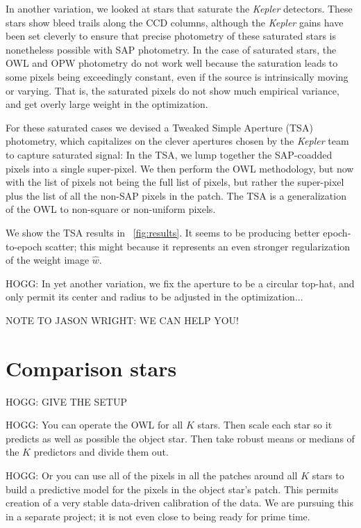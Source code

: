 \documentclass[12pt, letterpaper, preprint]{aastex}
\newcommand{\project}[1]{\textsl{#1}}
\begin{document}
In another variation, we looked at stars that saturate the \project{Kepler} detectors.
These stars show bleed trails along the CCD columns,
  although the \project{Kepler} gains have been set cleverly
  to ensure that precise photometry of these saturated stars is nonetheless possible with SAP photometry.
In the case of saturated stars, the OWL and OPW photometry do not work well
  because the saturation leads to some pixels being exceedingly constant,
  even if the source is intrinsically moving or varying.
That is, the saturated pixels do not show much empirical variance,
  and get overly large weight in the optimization.

For these saturated cases we devised a Tweaked Simple Aperture (TSA) photometry,
  which capitalizes on the clever apertures chosen by the \project{Kepler} team
  to capture saturated signal:
In the TSA, we lump together the SAP-coadded pixels into a single super-pixel.
We then perform the OWL methodology,
  but now with the list of pixels not being the full list of pixels,
  but rather the super-pixel plus the list of all the non-SAP pixels in the patch.
The TSA is a generalization of the OWL to non-square or non-uniform pixels.

We show the TSA results in \figurename~\ref{fig:results}.
It seems to be producing better epoch-to-epoch scatter;
  this might because it represents an even stronger regularization of the weight image $\hat{w}$.

HOGG:
In yet another variation, we fix the aperture to be a circular top-hat,
  and only permit its center and radius to be adjusted in the optimization...

NOTE TO JASON WRIGHT: WE CAN HELP YOU!

\section{Comparison stars}

HOGG:  GIVE THE SETUP

HOGG:  You can operate the OWL for all $K$ stars.
Then scale each star so it predicts as well as possible the object star.
Then take robust means or medians of the $K$ predictors and divide them out.

HOGG:  Or you can use all of the pixels in all the patches around all $K$ stars
  to build a predictive model for the pixels in the object star's patch.
This permits creation of a very stable data-driven calibration of the data.
We are pursuing this in a separate project;
  it is not even close to being ready for prime time.
\end{document}
